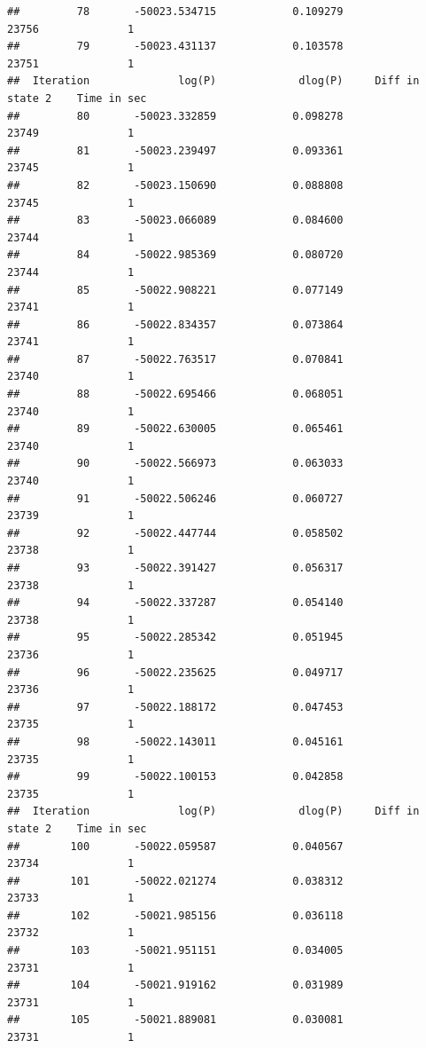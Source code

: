 \documentclass[11pt]{article}\usepackage[]{graphicx}\usepackage[]{color}
\makeatletter
\newenvironment{kframe}{%
 \def\at@end@of@kframe{}%
 \ifinner\ifhmode%
  \def\at@end@of@kframe{\end{minipage}}%
  \begin{minipage}{\columnwidth}%
 \fi\fi%
 \def\FrameCommand##1{\hskip\@totalleftmargin \hskip-\fboxsep
 \colorbox{shadecolor}{##1}\hskip-\fboxsep
     \hskip-\linewidth \hskip-\@totalleftmargin \hskip\columnwidth}%
 \MakeFramed {\advance\hsize-\width
   \@totalleftmargin\z@ \linewidth\hsize
   \@setminipage}}%
 {\par\unskip\endMakeFramed%
 \at@end@of@kframe}
\newenvironment{knitrout}{}{} %
\makeatother
\begin{document}
\begin{scriptsize}
\begin{knitrout}
\begin{kframe}
\begin{verbatim}
##         78       -50023.534715            0.109279               23756              1
##         79       -50023.431137            0.103578               23751              1
##  Iteration              log(P)             dlog(P)     Diff in state 2    Time in sec
##         80       -50023.332859            0.098278               23749              1
##         81       -50023.239497            0.093361               23745              1
##         82       -50023.150690            0.088808               23745              1
##         83       -50023.066089            0.084600               23744              1
##         84       -50022.985369            0.080720               23744              1
##         85       -50022.908221            0.077149               23741              1
##         86       -50022.834357            0.073864               23741              1
##         87       -50022.763517            0.070841               23740              1
##         88       -50022.695466            0.068051               23740              1
##         89       -50022.630005            0.065461               23740              1
##         90       -50022.566973            0.063033               23740              1
##         91       -50022.506246            0.060727               23739              1
##         92       -50022.447744            0.058502               23738              1
##         93       -50022.391427            0.056317               23738              1
##         94       -50022.337287            0.054140               23738              1
##         95       -50022.285342            0.051945               23736              1
##         96       -50022.235625            0.049717               23736              1
##         97       -50022.188172            0.047453               23735              1
##         98       -50022.143011            0.045161               23735              1
##         99       -50022.100153            0.042858               23735              1
##  Iteration              log(P)             dlog(P)     Diff in state 2    Time in sec
##        100       -50022.059587            0.040567               23734              1
##        101       -50022.021274            0.038312               23733              1
##        102       -50021.985156            0.036118               23732              1
##        103       -50021.951151            0.034005               23731              1
##        104       -50021.919162            0.031989               23731              1
##        105       -50021.889081            0.030081               23731              1

\end{verbatim}
\end{kframe}
\end{knitrout}
\end{scriptsize}
\end{document}
